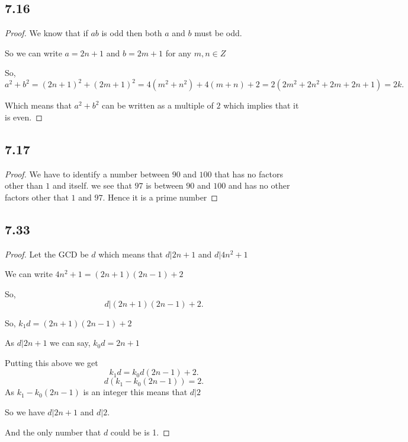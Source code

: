 \documentclass[a4paper]{report}
\begin{document}
\subsection*{7.16}
\begin{proof}
    

We know that if $ab$ is odd then both  $a$ and $b$ must be odd.

So we can write $a = 2n + 1$ and  $b = 2m + 1$ for any  $m,n \in Z$

So, \[
a^2 + b^2 = (2n + 1)^2 + (2m + 1)^2 = 4(m^2 + n^2) + 4(m + n) + 2 = 2(2m^2+2n^2+2m+2n+1) = 2k
.\] 

Which means that $a^2 + b^2$ can be written as a multiple of $2$ which implies that it is even.

\end{proof}

\subsection*{7.17}
\begin{proof}
We have to identify a number between $90$ and $100$ that has no factors other than $1$ and itself.
we see that $97$ is between $90$ and $100$ and has no other factors other that $1$ and $97$. Hence it is a prime number
\end{proof}

\subsection*{7.33}
\begin{proof}
    Let the GCD be $d$ which means that  $d | 2n + 1$ and  $d | 4n^2 + 1$

    We can write $4n^2 + 1 = (2n+1)(2n-1) + 2$
    
    So, \[
    d | (2n + 1)(2n - 1) + 2
    .\] 

    So, $k_1d = (2n + 1)(2n-1) + 2$

    As $d | 2n + 1$ we can say,  $k_0d = 2n + 1$

    Putting this above we get \[
        k_1d = k_0d(2n -1 ) + 2
    .\] 
    \[
    d(k_1 - k_0(2n-1)) = 2
    .\] 
    As $k_1 - k_0(2n-1)$ is an integer this means that $d | 2$

    So we have $d | 2n + 1$ and  $d | 2$.

    And the only number that $d$ could be is 1.


\end{proof}
\end{document}
